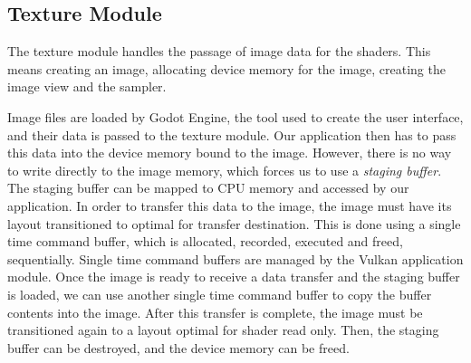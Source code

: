 \subsection{Texture Module}
The texture module handles the passage of image data for the shaders. This means creating an image, allocating device memory for the image, creating the image view and the sampler.

Image files are loaded by Godot Engine, the tool used to create the user interface, and their data is passed to the texture module. Our application then has to pass this data into the device memory bound to the image. However, there is no way to write directly to the image memory, which forces us to use a \textit{staging buffer}. The staging buffer can be mapped to CPU memory and accessed by our application. In order to transfer this data to the image, the image must have its layout transitioned to optimal for transfer destination. This is done using a single time command buffer, which is allocated, recorded, executed and freed, sequentially. Single time command buffers are managed by the Vulkan application module. Once the image is ready to receive a data transfer and the staging buffer is loaded, we can use another single time command buffer to copy the buffer contents into the image. After this transfer is complete, the image must be transitioned again to a layout optimal for shader read only. Then, the staging buffer can be destroyed, and the device memory can be freed.
